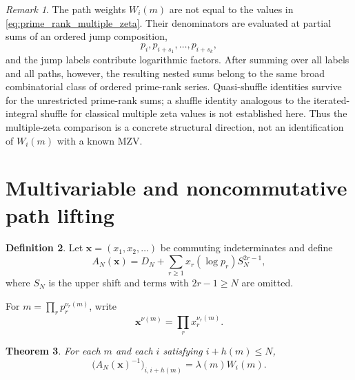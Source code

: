 \documentclass[11pt]{amsart}
\numberwithin{equation}{section}
\theoremstyle{plain}
\newtheorem{theorem}{Theorem}[section]
\theoremstyle{definition}
\newtheorem{definition}[theorem]{Definition}
\theoremstyle{remark}
\newtheorem{remark}[theorem]{Remark}
\begin{document}
\begin{remark}
\label{rem:Wi_mzv_status}
The path weights $W_i(m)$ are not equal to the values in \eqref{eq:prime_rank_multiple_zeta}.  Their denominators are evaluated at partial sums of an ordered jump composition,
\begin{equation}
p_i,p_{i+s_1},\ldots,p_{i+s_k},
\label{eq:path_partial_prime_denominators}
\end{equation}
and the jump labels contribute logarithmic factors.  After summing over all labels and all paths, however, the resulting nested sums belong to the same broad combinatorial class of ordered prime-rank series.  Quasi-shuffle identities survive for the unrestricted prime-rank sums; a shuffle identity analogous to the iterated-integral shuffle for classical multiple zeta values is not established here.  Thus the multiple-zeta comparison is a concrete structural direction, not an identification of $W_i(m)$ with a known MZV.
\end{remark}

\section{Multivariable and noncommutative path lifting}
\label{sec:path_lifting}

\begin{definition}
\label{def:commutative_lift}
Let $\mathbf x=(x_1,x_2,\ldots)$ be commuting indeterminates and define
\begin{equation}
A_N(\mathbf x)=D_N+\sum_{r\ge1}x_r(\log p_r)S_N^{2r-1},
\label{eq:commutative_lift}
\end{equation}
where $S_N$ is the upper shift and terms with $2r-1\ge N$ are omitted.
\end{definition}

For $m=\prod_rp_r^{\nu_r(m)}$, write
\begin{equation}
\mathbf x^{\nu(m)}=\prod_rx_r^{\nu_r(m)}.
\label{eq:monomial_label}
\end{equation}

\begin{theorem}
\label{thm:commutative_coefficient}
For each $m$ and each $i$ satisfying $i+h(m)\le N$,
\begin{equation}
[\mathbf x^{\nu(m)}]
\bigl(A_N(\mathbf x)^{-1}\bigr)_{i,i+h(m)}
=
\lambda(m)W_i(m).
\label{eq:commutative_coefficient_identity}
\end{equation}
\end{theorem}
\end{document}
